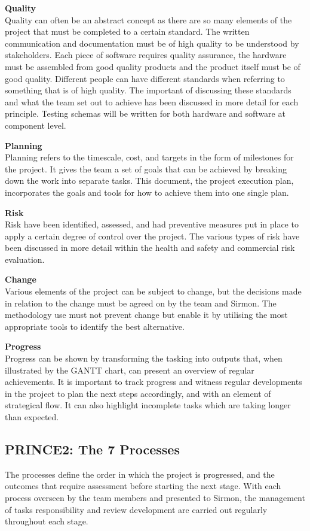 \documentclass [12pt]{article}
\begin{document}
\textbf{Quality}\\
Quality can often be an abstract concept as there are so many elements of the project that must be completed to a certain standard. The written communication and documentation must be of high quality to be understood by stakeholders. Each piece of software requires quality assurance, the hardware must be assembled from good quality products and the product itself must be of good quality. Different people can have different standards when referring to something that is of high quality. The important of discussing these standards and what the team set out to achieve has been discussed in more detail for each principle. Testing schemas will be written for both hardware and software at component level.

\textbf{Planning}\\
Planning refers to the timescale, cost, and targets in the form of milestones for the project. It gives the team a set of goals that can be achieved by breaking down the work into separate tasks. This document, the project execution plan, incorporates the goals and tools for how to achieve them into one single plan.

\textbf{Risk}\\
Risk have been identified, assessed, and had preventive measures put in place to apply a certain degree of control over the project. The various types of risk have been discussed in more detail within the health and safety and commercial risk evaluation.

\textbf{Change}\\
Various elements of the project can be subject to change, but the decisions made in relation to the change must be agreed on by the team and Sirmon. The methodology use must not prevent change but enable it by utilising the most appropriate tools to identify the best alternative.

\textbf{Progress}\\
Progress can be shown by transforming the tasking into outputs that, when illustrated by the GANTT chart, can present an overview of regular achievements. It is important to track progress and witness regular developments in the project to plan the next steps accordingly, and with an element of strategical flow. It can also highlight incomplete tasks which are taking longer than expected.

\subsection{PRINCE2: The 7 Processes}\label{sec:7_processes}
The processes define the order in which the project is progressed, and the outcomes that require assessment before starting the next stage. With each process overseen by the team members and presented to Sirmon, the management of tasks responsibility and review development are carried out regularly throughout each stage.
\end{document}
